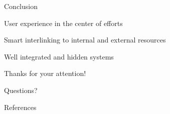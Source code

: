 \documentclass[10pt]{beamer}
\begin{document}
\begin{frame}{Conclusion}

  User experience in the center of efforts

  Smart interlinking to internal and external resources

  Well integrated and hidden systems

\end{frame}

\begin{frame}[standout]
  Thanks for your attention!

  \bigskip
  \alert{Questions?}
\end{frame}

\begin{frame}[allowframebreaks]{References}

  \nocite{*}
  
  

\end{frame}
\end{document}
